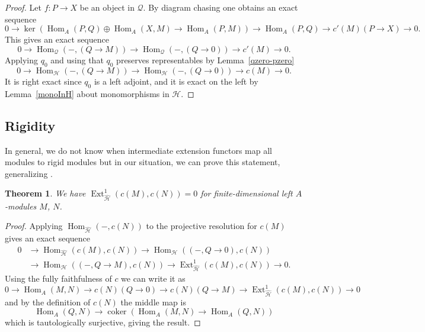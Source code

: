 \documentclass[11pt,a4paper]{amsart}
\theoremstyle{plain}
\newtheorem{thm}{Theorem}[section]
\theoremstyle{definition}
\begin{document}
\begin{proof}
Let $f\colon P\to X$ be an object in ${\mathcal{Q}}$.
By diagram chasing one obtains an exact
sequence
\[
0\to
\operatorname{ker}\left(\operatorname{Hom}_A(P,Q)\oplus \operatorname{Hom}_A(X,M)\to \operatorname{Hom}_A(P,M)\right) \to \operatorname{Hom}_A(P,Q) \to c'(M)(P\to X) \to 0.
\]
This gives an exact sequence
\[
0\to
\operatorname{Hom}_{\mathcal{Q}}(-,(Q\to M))
\to
\operatorname{Hom}_{\mathcal{Q}}(-,(Q\to 0))
\to
c'(M)\to 0.
\]
Applying $q_0$ and using that $q_0$ preserves representables by Lemma~\ref{qzero-pzero}
\[
0\to
\operatorname{Hom}_{\mathcal{H}}(-,(Q\to M))
\to
\operatorname{Hom}_{\mathcal{H}}(-,(Q\to 0))
\to
c(M)\to 0.
\]
It is right exact since $q_0$ is a left adjoint, and it is exact on the left by Lemma~\ref{monoInH} about monomorphisms in ${\mathcal{H}}$.
\end{proof}

\subsection*{Rigidity}
In general, we do not know when intermediate extension functors map all modules to rigid modules but in our situation, we can prove this statement, generalizing \cite[Theorem 5.6]{CIFR}.

\begin{thm} 
\label{rigid}
We have $\operatorname{Ext}^1_{\widehat{\mathcal{H}}  }({c} (M), {c} (N) )=0$ for finite-dimensional left $A$-modules $M$, $N$.
\end{thm}

\begin{proof} 
Applying $\operatorname{Hom}_{\widehat{\mathcal{H}}  } (-, {c} (N))$ to the projective resolution for ${c}(M)$
gives an exact sequence 
\[
\begin{aligned}
0 & \to \operatorname{Hom}_{\widehat{\mathcal{H}}  } ({c} (M), {c} (N))\to \operatorname{Hom}_{\mathcal{H}}( (-, Q\to 0), {c} (N)) \\
& \to \operatorname{Hom}_{\mathcal{H}} ( (-, Q\to M), {c} (N)) \to \operatorname{Ext}^1_{\widehat{\mathcal{H}}  }({c} (M), {c} (N)) \to 0.
\end{aligned}
\]
Using the fully faithfulness of ${c} $ we can write it as 
\[ 
0\to \operatorname{Hom}_A(M,N) \to {c}(N)(Q\to 0)\to {c}(N)(Q\to M)\to \operatorname{Ext}^1_{\widehat{\mathcal{H}}  }({c}(M), {c}(N))\to 0
\]
and by the definition of ${c}(N)$ the middle map is
\[ 
\operatorname{Hom}_A (Q,N) \to 
\operatorname{coker} (\operatorname{Hom}_A (M,N) \to \operatorname{Hom}_A (Q,N)) 
\]
which is tautologically surjective, giving the result.
\end{proof}
\end{document}
